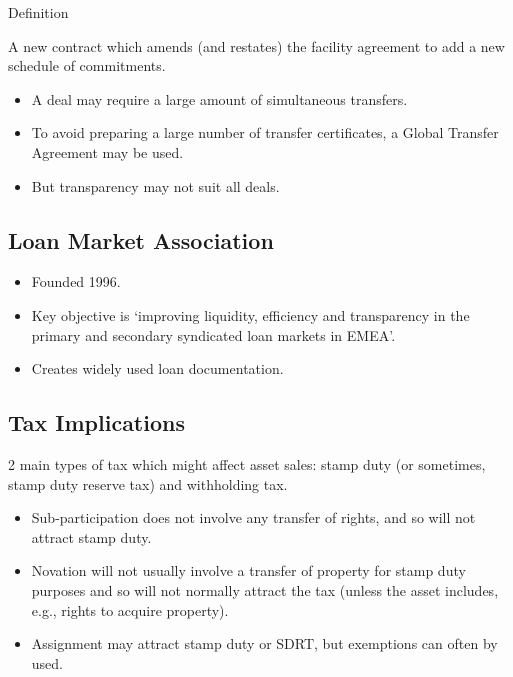 \documentclass[
]{article}
\providecommand{\tightlist}{%
  \setlength{\itemsep}{0pt}\setlength{\parskip}{0pt}}
\newenvironment{env-f09e27d9-67b8-4931-ab1f-ca6031966775}
{
    \savenotes\tcolorbox[blanker,breakable,left=5pt,borderline west={2pt}{-4pt}{yellow}]
}
{
    \endtcolorbox\spewnotes
}
\begin{document}
\begin{env-f09e27d9-67b8-4931-ab1f-ca6031966775}

Definition

A new contract which amends (and restates) the facility agreement to add
a new schedule of commitments.

\end{env-f09e27d9-67b8-4931-ab1f-ca6031966775}

\begin{itemize}
\tightlist
\item
  A deal may require a large amount of simultaneous transfers.
\item
  To avoid preparing a large number of transfer certificates, a Global
  Transfer Agreement may be used.
\item
  But transparency may not suit all deals.
\end{itemize}

\hypertarget{loan-market-association}{%
\subsection{Loan Market Association}\label{loan-market-association}}

\begin{itemize}
\tightlist
\item
  Founded 1996.
\item
  Key objective is `improving liquidity, efficiency and transparency in
  the primary and secondary syndicated loan markets in EMEA'.
\item
  Creates widely used loan documentation.
\end{itemize}

\hypertarget{tax-implications}{%
\subsection{Tax Implications}\label{tax-implications}}

2 main types of tax which might affect asset sales: stamp duty (or
sometimes, stamp duty reserve tax) and withholding tax.

\begin{itemize}
\tightlist
\item
  Sub-participation does not involve any transfer of rights, and so will
  not attract stamp duty.
\item
  Novation will not usually involve a transfer of property for stamp
  duty purposes and so will not normally attract the tax (unless the
  asset includes, e.g., rights to acquire property).
\item
  Assignment may attract stamp duty or SDRT, but exemptions can often by
  used.
\end{itemize}
\end{document}
